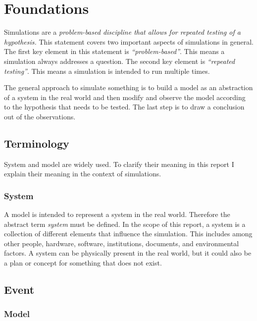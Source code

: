 
\section{Foundations}


Simulations are a \textit{problem-based discipline that allows for repeated testing of a hypothesis.} \cite{sokolowski2010modelingintro} This statement covers two important aspects of simulations in general. The first key element in this statement is \textit{“problem-based”}. This means a simulation always addresses a question. The second key element is \textit{“repeated testing”}. This means a simulation is intended to run multiple times.

The general approach to simulate something is to build a model as an abstraction of a system in the real world and then modify and observe the model according to the hypothesis that needs to be tested. The last step is to draw a conclusion out of the observations.

\subsection{Terminology}

System and model are widely used. To clarify their meaning in this report I explain their meaning in the context of simulations.

\subsubsection{System}

A model is intended to represent a system in the real world. Therefore the abstract term \textit{system} must be defined. In the scope of this report, a system is a collection of different elements that influence the simulation. This includes among other people, hardware, software, institutions, documents, and environmental factors. A system can be physically present in the real world, but it could also be a plan or concept for something that does not exist.

\subsection{Event}

\subsubsection{Model}


